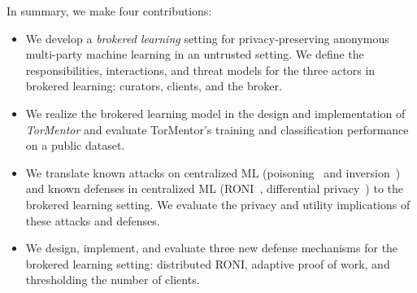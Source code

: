 In summary, we make four contributions:
\begin{itemize}[label=$\star$]
 \item We develop a \textit{brokered learning} setting for
    privacy-preserving anonymous multi-party machine learning in an
    untrusted setting. We define the responsibilities, interactions,
    and threat models for the three actors in brokered learning:
    curators, clients, and the broker.

 \item We realize the brokered learning model in the design and
    implementation of \textit{TorMentor} and evaluate TorMentor's
    training and classification performance on a public dataset.

 \item We translate known attacks on centralized ML 
    (poisoning~\cite{Huang:2011, Nelson:2008} and 
    inversion~\cite{Fredrikson:2014, Fredrikson:2015}) and known
    defenses in centralized ML (RONI~\cite{Barreno:2010}, differential
    privacy~\cite{Dwork:2014}) to the brokered learning setting. We
    evaluate the privacy and utility implications of these attacks and
    defenses.

 \item We design, implement, and evaluate three new defense mechanisms
    for the brokered learning setting: distributed RONI,
    adaptive proof of work, and thresholding the number of clients.

\end{itemize}


